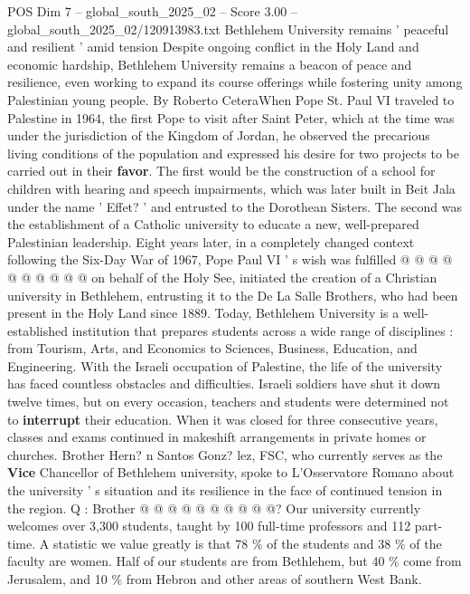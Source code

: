 \begin{textsample}{POS Dim 7 – global\_south\_2025\_02 – Score 3.00 – global\_south\_2025\_02/120913983.txt}  \label{ex:f7_pos_420}
Bethlehem University remains ' peaceful and resilient ' amid tension Despite ongoing conflict in the Holy Land and economic hardship, Bethlehem University remains a beacon of peace and resilience, even working to expand its course offerings while fostering unity among Palestinian young people.
By Roberto CeteraWhen Pope St.
Paul VI traveled to Palestine in 1964, the first Pope to visit after Saint Peter, which at the time was under the jurisdiction of the Kingdom of Jordan, he observed the precarious living conditions of the population and expressed his desire for two projects to be carried out in their \textbf{favor}.
The first would be the construction of a school for children with hearing and speech impairments, which was later built in Beit Jala under the name ' Effet? ' and entrusted to the Dorothean Sisters.
The second was the establishment of a Catholic university to educate a new, well-prepared Palestinian leadership.
Eight years later, in a completely changed context following the Six-Day War of 1967, Pope Paul VI ' s wish was fulfilled @ @ @ @ @ @ @ @ @ @ on behalf of the Holy See, initiated the creation of a Christian university in Bethlehem, entrusting it to the De La Salle Brothers, who had been present in the Holy Land since 1889.
Today, Bethlehem University is a well-established institution that prepares students across a wide range of disciplines : from Tourism, Arts, and Economics to Sciences, Business, Education, and Engineering.
With the Israeli occupation of Palestine, the life of the university has faced countless obstacles and difficulties.
Israeli soldiers have shut it down twelve times, but on every occasion, teachers and students were determined not to \textbf{interrupt} their education.
When it was closed for three consecutive years, classes and exams continued in makeshift arrangements in private homes or churches.
Brother Hern? n Santos Gonz? lez, FSC, who currently serves as the \textbf{Vice} Chancellor of Bethlehem university, spoke to L'Osservatore Romano about the university ' s situation and its resilience in the face of continued tension in the region.
Q : Brother @ @ @ @ @ @ @ @ @ @?
Our university currently welcomes over 3,300 students, taught by 100 full-time professors and 112 part-time.
A statistic we value greatly is that 78 \% of the students and 38 \% of the faculty are women.
Half of our students are from Bethlehem, but 40 \% come from Jerusalem, and 10 \% from Hebron and other areas of southern West Bank.

\end{textsample}
